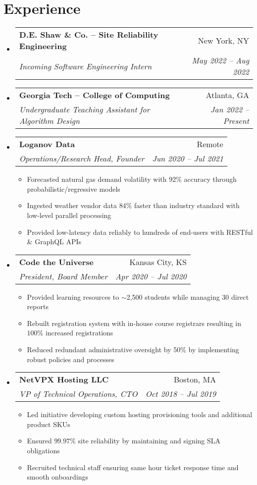 \documentclass[a4paper,11pt]{extarticle}
\makeatletter
\newcommand{\resumeItem}[1]{
	\item\small{
		#1 \vspace{-2pt}
	}
}
\newcommand{\resumeSubheading}[4]{
	\vspace{-1pt}\item
		\begin{tabular*}{1\linewidth}{l@{\extracolsep{\fill}}r}
			\textbf{#1} & #2 \\
			\textit{#3} & \textit{#4} \\
		\end{tabular*}\vspace{-3pt}
}
\newcommand{\resumeSubHeadingListStart}{\begin{itemize}[leftmargin=0.15in,label={}]}
\newcommand{\resumeSubHeadingListEnd}{\end{itemize}}
\newcommand{\resumeItemListStart}{\begin{itemize}\vspace{-3pt}}
\newcommand{\resumeItemListEnd}{\end{itemize}\vspace{-3pt}}
\makeatother
\begin{document}
\section{Experience}
	\resumeSubHeadingListStart
        \resumeSubheading
            {D.E. Shaw \& Co. -- Site Reliability Engineering}
            {New York, NY}
            {Incoming Software Engineering Intern}
            {May 2022 -- Aug 2022}
        \vspace{-1mm}
        \resumeSubheading
            {Georgia Tech -- College of Computing}
            {Atlanta, GA}
            {Undergraduate Teaching Assistant for Algorithm Design}
            {Jan 2022 -- Present}
        \vspace{-1mm}
		\resumeSubheading
            {Loganov Data}
            {Remote}
		    {Operations/Research Head, Founder}
            {Jun 2020 -- Jul 2021}
		\resumeItemListStart
			\resumeItem{Forecasted natural gas demand volatility with 92\%
				accuracy through probabilistic/regressive models}
			\resumeItem{Ingested weather vendor data 84\% faster than industry
				standard with low-level parallel processing}
			\resumeItem{Provided low-latency data reliably to hundreds of
				end-users with RESTful \& GraphQL APIs}
		\resumeItemListEnd
		\resumeSubheading
            {Code the Universe}
            {Kansas City, KS}
		    {President, Board Member}
            {Apr 2020 -- Jul 2020}
		\resumeItemListStart
			\resumeItem{Provided learning resources to $\sim$2,500
				students while managing 30 direct reports}
			\resumeItem{Rebuilt registration system with in-house course
				registrars resulting in $100$\% increased registrations}
			\resumeItem{Reduced redundant administrative oversight by 50\% by
				implementing robust policies and processes}
		\resumeItemListEnd
		\resumeSubheading
            {NetVPX Hosting LLC}
            {Boston, MA}
		    {VP of Technical Operations, CTO}
            {Oct 2018 -- Jul 2019}
		\resumeItemListStart
			\resumeItem{Led initiative developing custom hosting provisioning
				tools and additional product SKUs}
			\resumeItem{Ensured $99.97$\% site reliability by maintaining
				and signing SLA obligations}
			\resumeItem{Recruited technical staff ensuring same hour ticket
				response time and smooth onboardings}
		\resumeItemListEnd
	\resumeSubHeadingListEnd
\end{document}
